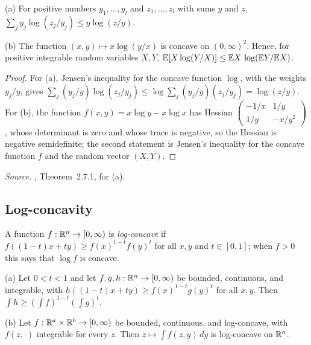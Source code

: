 
\begin{fact}\label{tb:logsum}
(a) For positive numbers \(y_1,\ldots,y_l\) and \(z_1,\ldots,z_l\) with sums
\(y\) and \(z\),
\(\sum_jy_j\log(z_j/y_j)\le y\log(z/y)\).

(b) The function \((x,y)\mapsto x\log(y/x)\) is concave on \((0,\infty)^2\).
Hence, for positive integrable random variables \(X,Y\),
\(\mathbb E[X\log(Y/X)]\le\mathbb E X\,\log(\mathbb E Y/\mathbb E X)\).
\end{fact}

\begin{proof}
For (a), Jensen's inequality for the concave function \(\log\), with the
weights \(y_j/y\), gives \(\sum_j(y_j/y)\log(z_j/y_j)\le\log\sum_j(y_j/y)(z_j/y_j)
=\log(z/y)\). For (b), the function \(f(x,y)=x\log y-x\log x\) has Hessian
\(\begin{pmatrix}-1/x&1/y\\1/y&-x/y^2\end{pmatrix}\), whose determinant is
zero and whose trace is negative, so the Hessian is negative semidefinite;
the second statement is Jensen's inequality for the concave function
\(f\) and the random vector \((X,Y)\).
\end{proof}

\emph{Source.} , Theorem~2.7.1, for (a).

\subsection{Log-concavity}\label{tb:sec:logconcave}

A function \(f:\mathbb R^n\to[0,\infty)\) is \emph{log-concave} if
\(f((1-t)x+ty)\ge f(x)^{1-t}f(y)^t\) for all \(x,y\) and \(t\in[0,1]\);
when \(f>0\) this says that \(\log f\) is concave.

\begin{fact}
\label{tb:prekopa}
(a) Let \(0<t<1\) and let \(f,g,h:\mathbb R^n\to[0,\infty)\) be bounded,
continuous, and integrable, with
\(h((1-t)x+ty)\ge f(x)^{1-t}g(y)^t\) for all \(x,y\). Then
\(\int h\ge(\int f)^{1-t}(\int g)^t\).

(b) Let \(f:\mathbb R^a\times\mathbb R^b\to[0,\infty)\) be bounded, continuous, and
log-concave, with \(f(z,\cdot)\) integrable for every \(z\). Then
\(z\mapsto\int f(z,y)\,dy\) is log-concave on \(\mathbb R^a\).
\end{fact}

